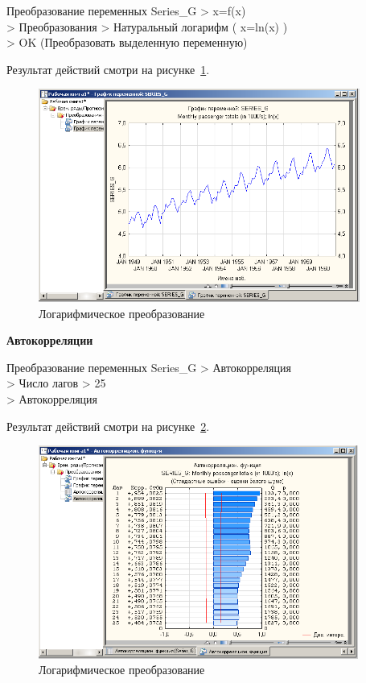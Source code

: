Преобразование переменных Series\_G > x=f(x)\\
> Преобразования > Натуральный логарифм ( x=ln(x) )\\
> OK (Преобразовать выделенную переменную)

Результат действий смотри на рисунке~\ref{fig:4}.

\begin{figure}[!h]
  \centering

  \includegraphics[height=7cm]
  {inc/Series_G/4.PNG}

  \caption{Логарифмическое преобразование}

  \label{fig:4}
\end{figure}

\begin{center}
  \textbf{Автокорреляции}
\end{center}

Преобразование переменных Series\_G > Автокорреляция\\
> Число лагов > 25\\
> Автокорреляция

Результат действий смотри на рисунке~\ref{fig:5}.

\begin{figure}[!h]
  \centering

  \includegraphics[height=7cm]
  {inc/Series_G/5.PNG}

  \caption{Логарифмическое преобразование}

  \label{fig:5}
\end{figure}

